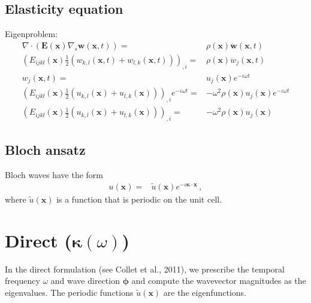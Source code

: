 \documentclass{article}
\numberwithin{equation}{section}
\newcommand{\imag}{\iota}
\newcommand{\vect}[1]{\boldsymbol{#1}}
\newcommand{\x}{x}
\newcommand{\vecx}{\vect{\x}}
\newcommand{\wavenum}{\kappa}
\newcommand{\wavevec}{\vect{\wavenum}}
\newcommand{\bloch}{e^{-\imag \wavevec \cdot \vecx}}
\newcommand{\kernel}[1]{\tilde{#1}}
\begin{document}
\subsection{Elasticity equation} \label{sec:prob.vector}

Eigenproblem:
%
\begin{align}
    \nabla \cdot \left(
        \boldsymbol{E}(\vecx) \nabla_s \vect{w}(\vecx, t)
    \right) =& \rho(\vecx) \ddot{\vect{w}}(\vecx, t) \nonumber \\
    \left(
        E_{ijkl}(\vecx) \frac{1}{2} \left(w_{k,l}(\vecx, t) + w_{l,k}(\vecx, t)\right)
    \right)_{,i} =& \rho(\vecx) \ddot{w}_j(\vecx, t) \nonumber \\
    w_j(\vecx, t) =& u_j(\vecx) e^{-\imag \omega t} \nonumber \\
    \left(
        E_{ijkl}(\vecx) \frac{1}{2} \left(u_{k,l}(\vecx) + u_{l,k}(\vecx)\right)
    \right)_{,i} e^{-\imag \omega t} =& -\omega^2 \rho(\vecx) u_j(\vecx) e^{
        -\imag \omega t
    } \nonumber \\
    \left(
        E_{ijkl}(\vecx) \frac{1}{2}\left(u_{k,l}(\vecx) + u_{l,k}(\vecx)\right)
    \right)_{,i} =& -\omega^2 \rho(\vecx) u_j(\vecx) \label{eq:prob.vector}
\end{align}


\subsection{Bloch ansatz} \label{sec:prob.bloch-ansatz}

Bloch waves have the form
%
\begin{align}
    u(\vecx) =& \kernel{u}(\vecx) \bloch \, , \label{eq:prob.bloch-ansatz}
\end{align}
%
where \(\kernel{u}(\vecx)\) is a function that is periodic on the unit cell.


\section{Direct ($\wavevec(\omega)$)} \label{sec:direct}

In the direct formulation (see Collet et al., 2011), we prescribe the temporal frequency \(\omega\) and wave direction \(\vect{\phi}\) and compute the wavevector magnitudes as the eigenvalues. The periodic functions \(\kernel{u}(\vecx)\) are the eigenfunctions.
\end{document}
